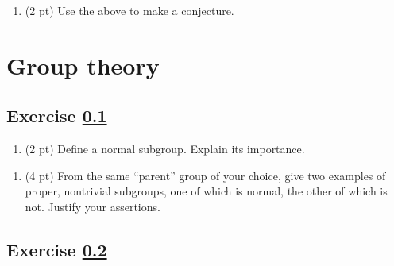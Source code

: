 \begin{enumerate}[resume, label=(\alph*)]
\item\label{itm : me00laQ2c} (2 pt) Use the above to make a conjecture.
\end{enumerate}

\spaceSolution{2in}{%
}%

%





%
%

\section*{Group theory}

\subsection{Exercise \ref{sec : me00gtQ1}}
\label{sec : me00gtQ1}

\begin{enumerate}[label=(\alph*)]
\item\label{itm : me0gtQ1a} (2 pt) Define a normal subgroup. Explain its importance.
\end{enumerate}

\spaceSolution{2in}{%
}%

\begin{enumerate}[resume, label=(\alph*)]
\item\label{itm : me0gtQ1b} (4 pt) From the same ``parent'' group of your choice, give two examples of proper, nontrivial subgroups, one of which is normal, the other of which is not. Justify your assertions.
\end{enumerate}

\spaceSolution{2in}{%
}%



\subsection{Exercise \ref{sec : me00gtQ2}}
\label{sec : me00gtQ2}

